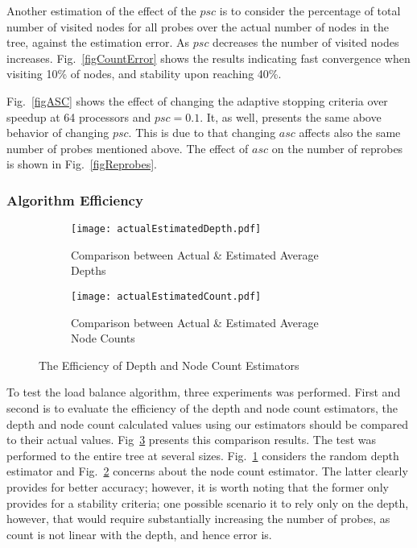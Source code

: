 \documentclass[conference,compsoc]{IEEEtran}
\begin{document}
Another estimation of the effect of the $ \mathit{psc} $ is to consider the percentage of total number of visited nodes for all probes over the actual number of nodes in the tree, against the estimation error. As $ \mathit{psc} $ decreases the number of visited nodes increases. Fig.~\ref{figCountError} shows the results indicating fast convergence when visiting 10\% of nodes, and stability upon reaching 40\%.


Fig.~\ref{figASC} shows the effect of changing the adaptive stopping criteria over speedup at 64 processors and $ \mathit{psc}=0.1 $. It, as well, presents the same above behavior of changing $ \mathit{psc} $. This is due to that changing $ \mathit{asc} $ affects also the same number of probes mentioned above. The effect of $ \mathit{asc} $ on the number of reprobes is shown in Fig.~\ref{figReprobes}.

\subsubsection{Algorithm Efficiency}
\begin{figure}
	\begin{subfigure}{\columnwidth}
		\centering
		\texttt{[image: actualEstimatedDepth.pdf]}
		\caption{\label{figActualEstimatedDepth}Comparison between Actual \& Estimated Average Depths}
	\end{subfigure}
	\begin{subfigure}{\columnwidth}
		\centering
		\texttt{[image: actualEstimatedCount.pdf]}
		\caption{\label{figActualEstimatedCount}Comparison between Actual \& Estimated Average Node Counts}
	\end{subfigure}
	\caption{The Efficiency of Depth and Node Count Estimators}
	\label{figActualEstimated}
\end{figure}
To test the load balance algorithm, three experiments was performed. First and second is to evaluate the efficiency of the depth and node count estimators, the depth and node count calculated values using our estimators should be compared to their actual values. Fig~\ref{figActualEstimated} presents this comparison results. The test was performed to the entire tree at several sizes. Fig.~\ref{figActualEstimatedDepth} considers the random depth estimator and Fig.~\ref{figActualEstimatedCount} concerns about the node count estimator. The latter clearly provides for better accuracy; however, it is worth noting that the former only provides for a stability criteria; one possible scenario it to rely only on the depth, however, that would require substantially increasing the number of probes, as count is not linear with the depth, and hence error is.
 
\end{document}
